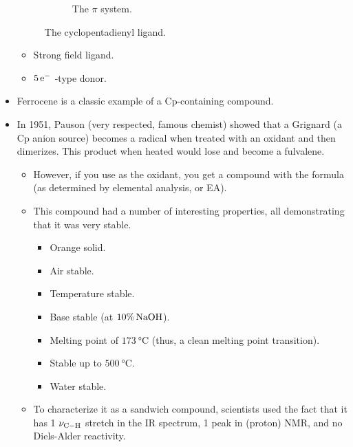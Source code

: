 \documentclass[../notes.tex]{subfiles}
\begin{document}
\begin{itemize}
\begin{figure}[h!]
\begin{subfigure}[b]{0.6\linewidth}
            \caption{The $\pi$ system.}
            \label{fig:ligand-Cpb}
        \end{subfigure}
        \caption{The cyclopentadienyl ligand.}
        \label{fig:ligand-Cp}
    \end{figure}
    \begin{itemize}
        \item Strong field ligand.
        \item $5\,\e[-]$ -type donor.
    \end{itemize}
    \item Ferrocene is a classic example of a Cp-containing compound.
    \item In 1951, Pauson (very respected, famous chemist) showed that a  Grignard (a Cp anion source) becomes a radical when treated with an oxidant and then dimerizes. This product when heated would lose  and become a fulvalene.
    \begin{itemize}
        \item However, if you use  as the oxidant, you get a compound with the formula  (as determined by elemental analysis, or EA).
        \item This compound had a number of interesting properties, all demonstrating that it was very stable.
        \begin{itemize}
            \item Orange solid.
            \item Air stable.
            \item Temperature stable.
            \item Base stable (at $10\%\,\ce{NaOH}$).
            \item Melting point of $\SI{173}{\celsius}$ (thus, a clean melting point transition).
            \item Stable up to $\SI{500}{\celsius}$.
            \item Water stable.
        \end{itemize}
        \item To characterize it as a sandwich compound, scientists used the fact that it has 1 $\nu_{\ce{C-H}}$ stretch in the IR spectrum, 1 peak in  (proton) NMR, and no Diels-Alder reactivity.

\end{itemize}
\end{itemize}
\end{document}
